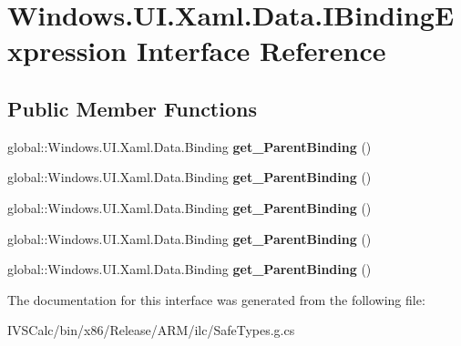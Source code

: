 \hypertarget{interface_windows_1_1_u_i_1_1_xaml_1_1_data_1_1_i_binding_expression}{}\section{Windows.\+U\+I.\+Xaml.\+Data.\+I\+Binding\+Expression Interface Reference}
\label{interface_windows_1_1_u_i_1_1_xaml_1_1_data_1_1_i_binding_expression}
\subsection*{Public Member Functions}
\begin{DoxyCompactItemize}
\item 
\mbox{\label{interface_windows_1_1_u_i_1_1_xaml_1_1_data_1_1_i_binding_expression_a420ad1899759228f7d07a9b43d3dca26}} 
global\+::\+Windows.\+U\+I.\+Xaml.\+Data.\+Binding {\bfseries get\+\_\+\+Parent\+Binding} ()
\item 
\mbox{\label{interface_windows_1_1_u_i_1_1_xaml_1_1_data_1_1_i_binding_expression_a420ad1899759228f7d07a9b43d3dca26}} 
global\+::\+Windows.\+U\+I.\+Xaml.\+Data.\+Binding {\bfseries get\+\_\+\+Parent\+Binding} ()
\item 
\mbox{\label{interface_windows_1_1_u_i_1_1_xaml_1_1_data_1_1_i_binding_expression_a420ad1899759228f7d07a9b43d3dca26}} 
global\+::\+Windows.\+U\+I.\+Xaml.\+Data.\+Binding {\bfseries get\+\_\+\+Parent\+Binding} ()
\item 
\mbox{\label{interface_windows_1_1_u_i_1_1_xaml_1_1_data_1_1_i_binding_expression_a420ad1899759228f7d07a9b43d3dca26}} 
global\+::\+Windows.\+U\+I.\+Xaml.\+Data.\+Binding {\bfseries get\+\_\+\+Parent\+Binding} ()
\item 
\mbox{\label{interface_windows_1_1_u_i_1_1_xaml_1_1_data_1_1_i_binding_expression_a420ad1899759228f7d07a9b43d3dca26}} 
global\+::\+Windows.\+U\+I.\+Xaml.\+Data.\+Binding {\bfseries get\+\_\+\+Parent\+Binding} ()
\end{DoxyCompactItemize}


The documentation for this interface was generated from the following file\+:\begin{DoxyCompactItemize}
\item 
I\+V\+S\+Calc/bin/x86/\+Release/\+A\+R\+M/ilc/Safe\+Types.\+g.\+cs\end{DoxyCompactItemize}
